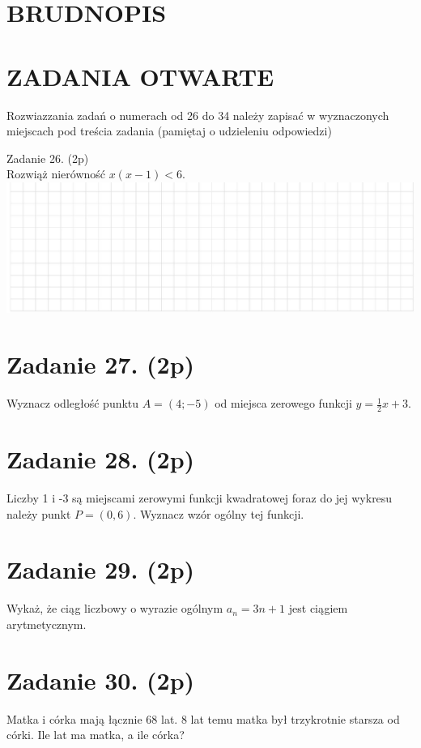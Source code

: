 \documentclass[10pt]{article}
\begin{document}
\section*{BRUDNOPIS}
\section*{ZADANIA OTWARTE}
Rozwiazzania zadań o numerach od 26 do 34 należy zapisać w wyznaczonych miejscach pod treścia zadania (pamiętaj o udzieleniu odpowiedzi)

Zadanie 26. (2p)\\
Rozwiąż nierówność \(x(x-1)<6\).\\
\includegraphics[max width=\textwidth, center]{2024_11_21_be8c615186155473dc68g-08}

\section*{Zadanie 27. (2p)}
Wyznacz odległość punktu \(A=(4 ;-5)\) od miejsca zerowego funkcji \(y=\frac{1}{2} x+3\).

\section*{Zadanie 28. (2p)}
Liczby 1 i -3 są miejscami zerowymi funkcji kwadratowej foraz do jej wykresu należy punkt \(P=(0,6)\). Wyznacz wzór ogólny tej funkcji.

\section*{Zadanie 29. (2p)}
Wykaż, że ciąg liczbowy o wyrazie ogólnym \(a_{n}=3 n+1\) jest ciągiem arytmetycznym.

\section*{Zadanie 30. (2p)}
Matka i córka mają łącznie 68 lat. 8 lat temu matka był trzykrotnie starsza od córki. Ile lat ma matka, a ile córka?
\end{document}
